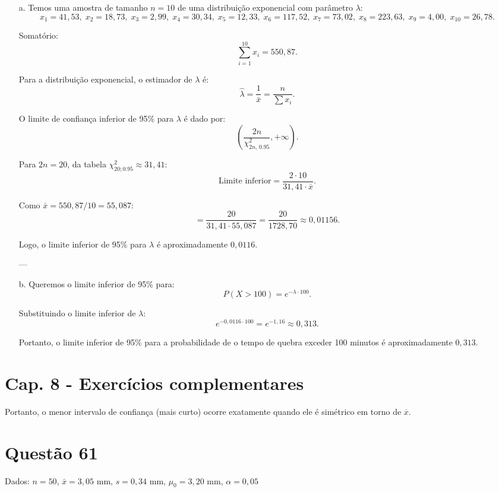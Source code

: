 \documentclass[12pt]{article}
\newcommand{\quest}[1]{\section*{Questão #1}} %
\begin{document}
\begin{enumerate}
    \item[a.] Temos uma amostra de tamanho \(n=10\) de uma distribuição exponencial com parâmetro \(\lambda\):
    \[
    x_1=41,53,\; x_2=18,73,\; x_3=2,99,\; x_4=30,34,\; x_5=12,33,\; 
    x_6=117,52,\; x_7=73,02,\; x_8=223,63,\; x_9=4,00,\; x_{10}=26,78.
    \]
    
    Somatório:
    \[
    \sum_{i=1}^{10} x_i = 550,87.
    \]
    
    Para a distribuição exponencial, o estimador de \(\lambda\) é:
    \[
    \hat{\lambda} = \frac{1}{\bar{x}} = \frac{n}{\sum x_i}.
    \]
    
    O limite de confiança inferior de 95\% para \(\lambda\) é dado por:
    \[
    \left( \frac{2n}{\chi^2_{2n,\,0.95}} , +\infty \right).
    \]
    
    Para \(2n=20\), da tabela \(\chi^2_{20;0.95} \approx 31,41\):
    \[
    \text{Limite inferior} = \frac{2 \cdot 10}{31,41 \cdot \bar{x}}.
    \]
    
    Como \(\bar{x} = 550,87/10 = 55,087\):
    \[
    = \frac{20}{31,41 \cdot 55,087} 
    = \frac{20}{1728,70} 
    \approx 0,01156.
    \]
    
    Logo, o limite inferior de 95\% para \(\lambda\) é aproximadamente \(0,0116\).
    
    ---
    
    \item[b.] Queremos o limite inferior de 95\% para:
    \[
    P(X>100) = e^{-\lambda \cdot 100}.
    \]
    
    Substituindo o limite inferior de \(\lambda\):
    \[
    e^{-0,0116 \cdot 100} = e^{-1,16} \approx 0,313.
    \]
    
    Portanto, o limite inferior de 95\% para a probabilidade de o tempo de quebra exceder 100 minutos é aproximadamente \(0,313\).
\end{enumerate}




\section{Cap. 8 - Exercícios complementares}

Portanto, o menor intervalo de confiança (mais curto) ocorre exatamente quando ele é simétrico em torno de \(\overline{x}\).

\quest{61}

Dados: $n = 50$, $\bar{x} = 3{,}05$ mm, $s = 0{,}34$ mm, $\mu_0 = 3{,}20$ mm, $\alpha = 0{,}05$
\end{document}
